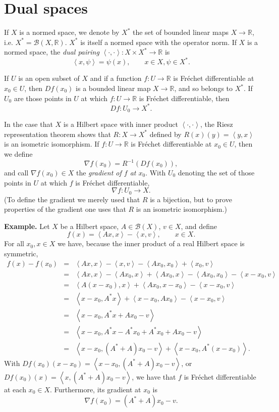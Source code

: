 \documentclass{article}
\newcommand{\inner}[2]{\left\langle #1, #2 \right\rangle}
\theoremstyle{definition}
\begin{document}
\section{Dual spaces}
If $X$ is a normed space, we denote by $X^*$  the set of bounded linear maps $X \to \mathbb{R}$, i.e. $X^*=\mathscr{B}(X,\mathbb{R})$. $X^*$ is itself a normed
space with the operator norm.
 If $X$ is a normed space, the {\em dual pairing} $\inner{\cdot}{\cdot}:X \times X^* \to \mathbb{R}$ is 
 \[
 \inner{x}{\psi}=\psi(x), \qquad x \in X, \psi \in X^*.
 \]


If $U$ is an open subset of $X$ and if a function $f:U \to \mathbb{R}$ is Fr\'echet differentiable at $x_0 \in U$, then
$Df(x_0)$ is a bounded linear map $X \to \mathbb{R}$, and so belongs to $X^*$. 
If $U_0$ are those points in $U$ at which $f:U \to \mathbb{R}$ is Fr\'echet differentiable, then
\[
Df:U_0 \to X^*.
\]

In the case that $X$ is a Hilbert space with inner product $\inner{\cdot}{\cdot}$,
 the Riesz representation theorem shows that
  $R:X \to X^*$ defined by  $R(x)(y)=\inner{y}{x}$ is an isometric isomorphism.
If $f:U \to \mathbb{R}$ is Fr\'echet differentiable at $x_0 \in U$, then we define
\[
\nabla f(x_0) = R^{-1}(Df(x_0)),
\]
and call $\nabla f(x_0) \in X$ the {\em gradient of $f$ at $x_0$}. 
With $U_0$ denoting the set of those points in $U$ at which $f$ is Fr\'echet differentiable,
\[
\nabla f:U_0 \to X.
\]
(To define the gradient we merely used that $R$ is a bijection,
but to prove properties of the gradient one uses that $R$ is an isometric isomorphism.)


\textbf{Example.} Let $X$ be a  Hilbert space, $A \in \mathscr{B}(X)$, $v \in X$, and define 
\[
f(x)=\inner{Ax}{x}-\inner{x}{v}, \qquad x \in X.
\]
For all $x_0,x \in X$ we have, because the inner product of a real Hilbert space is symmetric,
\begin{eqnarray*}
f(x)-f(x_0)&=&\inner{Ax}{x}-\inner{x}{v}-\inner{Ax_0}{x_0}+\inner{x_0}{v}\\
&=&\inner{Ax}{x}-\inner{Ax_0}{x}+\inner{Ax_0}{x} -\inner{Ax_0}{x_0}-\inner{x-x_0}{v}\\
&=&\inner{A(x-x_0)}{x}+\inner{Ax_0}{x-x_0} - \inner{x-x_0}{v}\\
&=&\inner{x-x_0}{A^*x}+\inner{x-x_0}{Ax_0} -\inner{x-x_0}{v}\\
&=&\inner{x-x_0}{A^*x+Ax_0-v}\\
&=&\inner{x-x_0}{A^*x-A^*x_0+A^*x_0+Ax_0-v}\\
&=&\inner{x-x_0}{(A^*+A)x_0-v}+ \inner{x-x_0}{A^*(x-x_0)}.
\end{eqnarray*}
With $Df(x_0)(x-x_0)=\inner{x-x_0}{(A^*+A)x_0-v}$, or $Df(x_0)(x)=\inner{x}{(A^*+A)x_0-v}$,  
we have that $f$ is Fr\'echet differentiable at each $x_0 \in X$.
Furthermore, its gradient at $x_0$ is
\[
\nabla f(x_0)=(A^*+A)x_0-v.
\]
\end{document}
